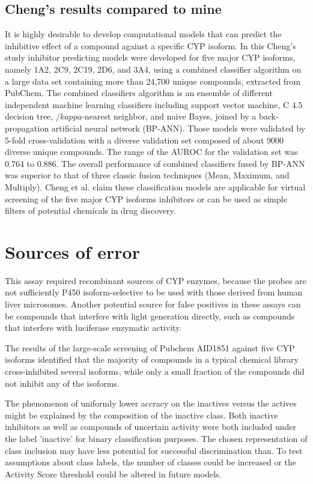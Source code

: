 \subsection{Cheng's results compared to mine}
It is highly desirable to develop computational models that can predict the inhibitive effect of a compound against a specific CYP isoform. In this Cheng's study inhibitor predicting models were developed for five major CYP isoforms, namely 1A2, 2C9, 2C19, 2D6, and 3A4, using a combined classifier algorithm on a large data set containing more than 24,700 unique compounds, extracted from PubChem. The combined classifiers algorithm is an ensemble of different independent machine learning classifiers including support vector machine, C 4.5 decision tree, $/kappa$-nearest neighbor, and naive Bayes, joined by a back-propagation artificial neural network (BP-ANN). Those models were validated by 5-fold cross-validation with a diverse validation set composed of about 9000 diverse unique compounds. The range of the AUROC for the validation set was 0.764 to 0.886. The overall performance of combined classifiers fused by BP-ANN was superior to that of three classic fusion techniques (Mean, Maximum, and Multiply). Cheng et al. claim these classification models are applicable for virtual screening of the five major CYP isoforms inhibitors or can be used as simple filters of potential chemicals in drug discovery.\cite{Cheng2011}


\section{Sources of error}
This assay required recombinant sources of CYP enzymes, because the probes are not sufficiently P450 isoform-selective to be used with those derived from human liver microsomes. Another potential source for false positives in these assays can be compounds that interfere with light generation directly, such as compounds that interfere with luciferase enzymatic activity. \cite{Zlokarnik2005}

The results of the large-scale screening of Pubchem AID1851 against five CYP isoforms identified that the majority of compounds in a typical chemical library cross-inhibited several isoforms, while only a small fraction of the compounds did not inhibit any of the isoforms. \cite{Veith2009}

The phenomenon of uniformly lower accracy on the inactives versus the actives might be explained by the composition of the inactive class. Both inactive inhibitors as well as compounds of uncertain activity were both included under the label 'inactive' for binary classification purposes. The chosen representation of class inclusion may have less potential for successful discrimination than. To test assumptions about class labels, the number of classes could be increased or the Activity Score threshold could be altered in future models.



